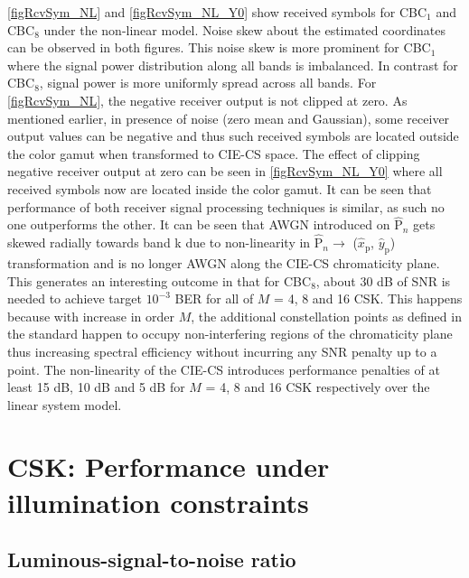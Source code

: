\documentclass[10pt,letterpaper]{article}
\begin{document}
\figurename{ }\ref{figRcvSym_NL} and \figurename{ }\ref{figRcvSym_NL_Y0} show received symbols for CBC$_{1}$ and CBC$_{8}$ under the non-linear model. Noise skew about the estimated coordinates can be observed in both figures. This noise skew is more prominent for CBC$_{1}$ where the signal power distribution along all bands is imbalanced. In contrast for CBC$_{8}$, signal power is more uniformly spread across all bands. For \figurename{ }\ref{figRcvSym_NL}, the negative receiver output is not clipped at zero. As mentioned earlier, in presence of noise (zero mean and Gaussian), some receiver output values can be negative and thus such received symbols are located outside the color gamut when transformed to CIE-CS space. The effect of clipping negative receiver output at zero can be seen in \figurename{ }\ref{figRcvSym_NL_Y0} where all received symbols now are located inside the color gamut. It can be seen that performance of both receiver signal processing techniques is similar, as such no one outperforms the other. It can be seen that AWGN introduced on $\hat{\text{P}}_{n}$ gets skewed radially towards band k due to non-linearity in $\hat{\text{P}}_{n}\rightarrow$ ($\hat{x}_{\text{p}}$, $\hat{y}_{\text{p}}$) transformation and is no longer AWGN along the CIE-CS chromaticity plane. This generates an interesting outcome in that for CBC$_{8}$, about 30 dB of SNR is needed to achieve target $10^{-3}$ BER for all of $M$ = 4, 8 and 16 CSK. This happens because with increase in order $M$, the additional constellation points as defined in the standard happen to occupy non-interfering regions of the chromaticity plane thus increasing spectral efficiency without incurring any SNR penalty up to a point. The non-linearity of the CIE-CS introduces performance penalties of at least 15 dB, 10 dB and 5 dB for $M$ = 4, 8 and 16 CSK respectively over the linear system model. 

\section{CSK: Performance under illumination constraints}\label{sCSKLSNR}

\subsection{Luminous-signal-to-noise ratio}\label{ssLSNR}
\end{document}
